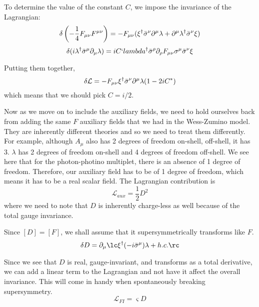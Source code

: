 To determine the value of the constant $C$, we impose the invariance of the Lagrangian:
\begin{equation}
    \delta \left( -\frac{1}{4} F_{\mu\nu}F^{\mu\nu} \right) = -F_{\mu\nu}( \xi^\dagger \Bar{\sigma}^\nu \partial^\mu \lambda + \partial^\mu\lambda^\dagger \Bar{\sigma}^\nu \xi)
    \label{eqn:10:u1 gauge theory:photon kinetic variance}
\end{equation}
\begin{equation}
    \delta(i\lambda^\dagger \Bar{\sigma}^\mu \partial_\mu \lambda) = i C` lambda^\dagger \Bar{\sigma}^\rho \partial_\rho F_{\mu\nu}\sigma^\mu \Bar{\sigma}^\nu \xi
    \label{eqn:10:u1 gauge theory:photino kinetic variance}
\end{equation}

Putting them together,
\begin{equation}
    \delta\mathcal{L} = -F_{\mu\nu} \xi^\dagger \Bar{\sigma}^\nu \partial^\mu \lambda (1-2iC^*)
\end{equation}
which means that we should pick $C = i/2$.

Now as we move on to include the auxiliary fields, we need to hold ourselves back from adding the same $F$ auxiliary fields that we had in the Wess-Zumino model. They are inherently different theories and so we need to treat them differently. For example, although $A_\mu$ also has 2 degrees of freedom on-shell, off-shell, it has 3. $\lambda$ has 2 degrees of freedom on-shell and 4 degrees of freedom off-shell. We see here that for the photon-photino multiplet, there is an absence of 1 degree of freedom. Therefore, our auxiliary field has to be of 1 degree of freedom, which means it has to be a real scalar field. The Lagrangian contribution is
\begin{equation}
    \mathcal{L}_{aux} = \frac{1}{2} D^2
\end{equation}
where we need to note that $D$ is inherently charge-less as well because of the total gauge invariance.

Since $[D] = [F]$, we shall assume that it supersymmetrically transforms like $F$.
\begin{equation}
    \delta D = \partial_\mu \lc\xi^\dagger (-i\Bar{\sigma}^\mu) \lambda + h.c.\rc
\end{equation}

Since we see that $D$ is real, gauge-invariant, and transforms as a total derivative, we can add a linear term to the Lagrangian and not have it affect the overall invariance. This will come in handy when spontaneously breaking supersymmetry.
\begin{equation}
    \mathcal{L}_{FI} = \varsigma D
\end{equation}

